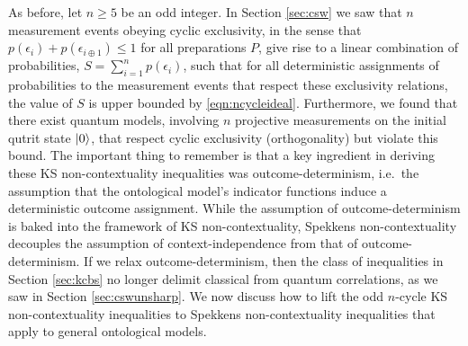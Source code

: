 As before, let $n\geq 5$ be an odd integer.
In Section \ref{sec:csw} we saw that $n$ measurement events obeying cyclic exclusivity, in the sense that $p(\epsilon_i)+p(\epsilon_{i\oplus 1})\leq 1$ for all preparations $P$, give rise to a linear combination of probabilities, $S=\sum_{i=1}^n p(\epsilon_i)$,
such that for all deterministic assignments of probabilities to the measurement events that respect these exclusivity relations, the value of $S$ is upper bounded by \ref{eqn:ncycleideal}.
Furthermore, we found that there exist quantum models, involving $n$ projective measurements on the initial qutrit state $\ket{0}$, that respect cyclic exclusivity (orthogonality) but violate this bound.
The important thing to remember is that a key ingredient in deriving these KS non-contextuality inequalities was outcome-determinism, i.e.\ the assumption that the ontological model's indicator functions induce a deterministic outcome assignment. While the assumption of outcome-determinism is baked into the framework of KS non-contextuality, Spekkens non-contextuality decouples the assumption of context-independence from that of outcome-determinism. If we relax outcome-determinism, then the class of inequalities in Section \ref{sec:kcbs} no longer delimit classical from quantum correlations, as we saw in Section \ref{sec:cswunsharp}. We now discuss how to lift the odd $n$-cycle KS non-contextuality inequalities to Spekkens non-contextuality inequalities that apply to general ontological models.

